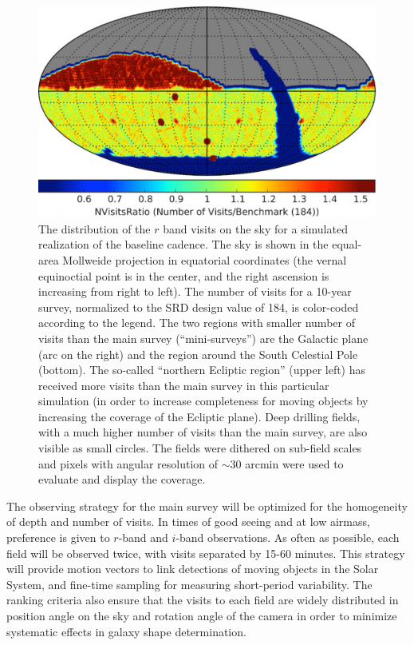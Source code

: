 \begin{figure}
\includegraphics[width=1.0\hsize,clip]{rBandWhite.png}
\vskip -0.01in
\caption{The distribution of the $r$ band visits on the sky for a simulated
realization of the baseline cadence. The sky is shown in the equal-area Mollweide
projection in equatorial coordinates (the vernal equinoctial point is in the center, and
the right ascension is increasing from right to left). The number of visits for
a 10-year survey, normalized to the SRD design value of 184, is color-coded according
to the legend. The two regions with smaller number of visits than the main survey
(``mini-surveys'') are the Galactic plane (arc on the right) and the region around the
South Celestial Pole (bottom). The so-called ``northern Ecliptic region'' (upper left)
has received more visits than the main survey in this particular simulation (in
order to increase completeness for moving objects by increasing the coverage of
the Ecliptic plane). Deep drilling fields, with a much higher number of visits than
the main survey, are also visible as small circles. The fields were dithered on
sub-field scales and pixels with angular resolution of $\sim$30 arcmin were used
to evaluate and display the coverage.}
\label{Fig:rbandSky}
\end{figure}

The observing strategy for the main survey will be optimized for the homogeneity
of depth and number of visits. In times of good seeing and at low airmass, preference
is given to $r$-band and $i$-band observations. As often as possible, each field will be
observed twice, with visits separated by 15-60 minutes. This strategy will provide motion
vectors to link detections of moving objects in the Solar System, and fine-time sampling
for measuring short-period variability. The ranking criteria also ensure that the
visits to each field are widely distributed in position angle on the sky and
rotation angle of the camera in order to minimize systematic effects in galaxy shape
determination.

